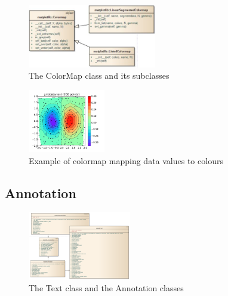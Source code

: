 \documentclass[pdftex,10pt,a4paper]{report}
\begin{document}
\begin{figure}[ht!]
        \centering
                \includegraphics[width=0.5\textwidth]{img/umls/kevin/cm}
        \caption{The ColorMap class and its subclasses}\label{fig:cm}
\end{figure}

\begin{figure}[ht!]
        \centering
                \includegraphics[width=0.3\textwidth]{img/umls/kevin/griddata}
        \caption{Example of colormap mapping data values to colours}\label{fig:artistExAgg}
\end{figure}

\subsection{Annotation}

\begin{figure}[ht!]
        \centering
                \includegraphics[width=0.4\textwidth]{img/umls/derek/annotation}
        \caption{The Text class and the Annotation classes}\label{fig:artistExAgg}
\end{figure}
\end{document}
